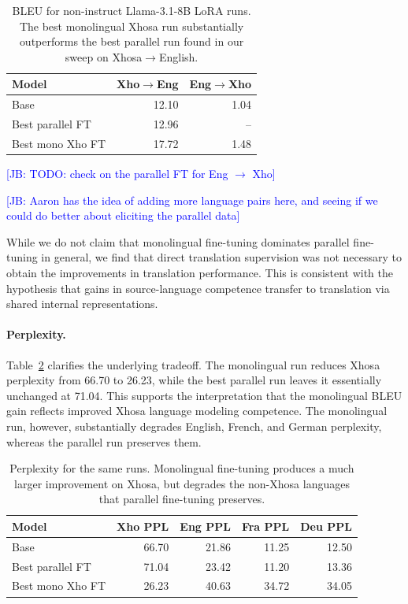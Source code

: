 \documentclass[11pt]{article}
\newcommand{\jb}[1]{\textcolor{blue}{[JB: #1]}}
\begin{document}
\begin{table}[t]
\centering
\small
\begin{tabular}{lrr}
\hline
Model & Xho$\rightarrow$Eng & Eng$\rightarrow$Xho \\
\hline
Base & 12.10 & 1.04 \\
Best parallel FT & 12.96 & -- \\
Best mono Xho FT & 17.72 & 1.48 \\
\hline
\end{tabular}
\caption{BLEU for non-instruct Llama-3.1-8B LoRA runs. The best monolingual Xhosa run substantially outperforms the best parallel run found in our sweep on Xhosa$\rightarrow$English.}

\jb{TODO: check on the parallel FT for Eng $\to$ Xho}

\jb{Aaron has the idea of adding more language pairs here, and seeing if we could do better about eliciting the parallel data}
\label{tab:mono-vs-parallel-bleu}
\end{table}

While we do not claim that monolingual fine-tuning dominates parallel fine-tuning in general, we find that direct translation supervision was not necessary to obtain the improvements in translation performance.
This is consistent with the hypothesis that gains in source-language competence transfer to translation via shared internal representations.

\paragraph{Perplexity.}
Table~\ref{tab:mono-vs-parallel-ppl} clarifies the underlying tradeoff.
The monolingual run reduces Xhosa perplexity from 66.70 to 26.23, while the best parallel run leaves it essentially unchanged at 71.04.
This supports the interpretation that the monolingual BLEU gain reflects improved Xhosa language modeling competence.
The monolingual run, however, substantially degrades English, French, and German perplexity, whereas the parallel run preserves them.

\begin{table}[t]
\centering
\small
\begin{tabular}{lrrrr}
\hline
Model & Xho PPL & Eng PPL & Fra PPL & Deu PPL \\
\hline
Base & 66.70 & 21.86 & 11.25 & 12.50 \\
Best parallel FT & 71.04 & 23.42 & 11.20 & 13.36 \\
Best mono Xho FT & 26.23 & 40.63 & 34.72 & 34.05 \\
\hline
\end{tabular}
\caption{Perplexity for the same runs. Monolingual fine-tuning produces a much larger improvement on Xhosa, but degrades the non-Xhosa languages that parallel fine-tuning preserves.}
\label{tab:mono-vs-parallel-ppl}
\end{table}
\end{document}
